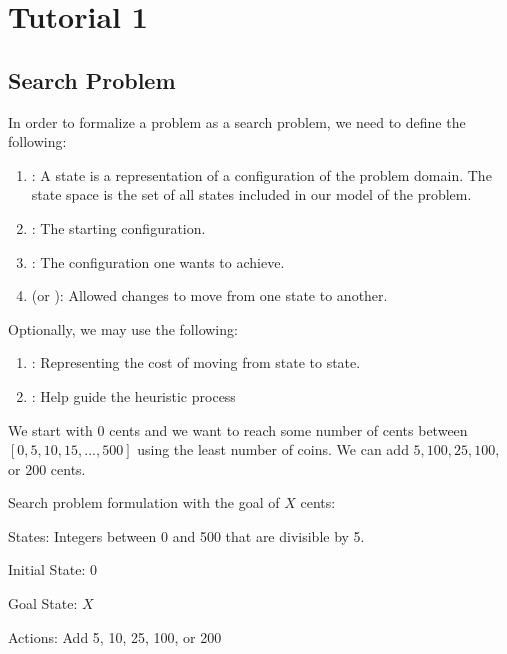 \setlength{\parindent}{0em}

\section*{Tutorial 1}

\subsection*{Search Problem}

In order to formalize a problem as a search problem, we need to define the following:

\begin{enumerate}
    \item {}: A state is a representation of a configuration of the problem domain. The state space is the set of all states included in our model of the problem.
    \item {}: The starting configuration.
    \item {}: The configuration one wants to achieve.
    \item {} (or ): Allowed changes to move from one state to another.
\end{enumerate}

Optionally, we may use the following:
\begin{enumerate}
    \item {}: Representing the cost of moving from state to state.
    \item {}: Help guide the heuristic process
\end{enumerate}

\begin{example}
    We start with $0$ cents and we want to reach some number of cents between $[0, 5, 10, 15, ..., 500]$ using the least number of coins. We can add $5, 100, 25, 100$, or $200$ cents.

    Search problem formulation with the goal of $X$ cents:
    \begin{listu}
        \item States: Integers between 0 and 500 that are divisible by 5.
        \item Initial State: 0
        \item Goal State: $X$
        \item Actions: Add 5, 10, 25, 100, or 200
    \end{listu}
\end{example}

